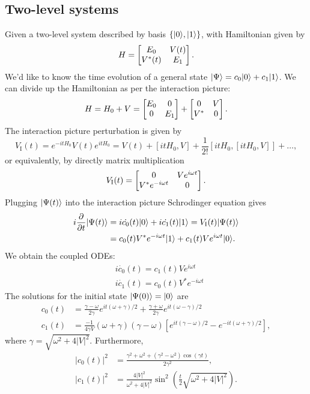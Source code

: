 \documentclass{article}
\begin{document}
\subsection{Two-level systems}
Given a two-level system described by basis $\{|0\rangle,|1\rangle\}$, with Hamiltonian given by
\begin{equation}
    H=\begin{bmatrix}{E_0}&{V(t)}\\{V^*(t)}&{E_1}\end{bmatrix}.
\end{equation}
We'd like to know the time evolution of a general state $|\Psi\rangle=c_0|0\rangle+c_1|1\rangle$. We can divide up the Hamiltonian as per the interaction picture:
\begin{equation}
    H=H_0+V=\begin{bmatrix}{E_0}&{0}\\{0}&{E_1}\end{bmatrix}+\begin{bmatrix}{0}&{V}\\{V^*}&{0}\end{bmatrix}.
\end{equation}
The interaction picture perturbation is given by
\begin{equation}
    V_{\mathrm{I}}(t)=e^{-itH_0}V(t)e^{itH_0}=V(t)+[itH_0,V]+\frac{1}{2!}[itH_0,[itH_0,V]]+\dots,
\end{equation}
or equivalently, by directly matrix multiplication
\begin{equation}
    V_{\mathrm{I}}(t)=\begin{bmatrix}{0}&{Ve^{i\omega t}}\\{V^*e^{-i\omega t}}&{0}\end{bmatrix}.
\end{equation}
Plugging $|\Psi(t)\rangle$ into the interaction picture Schrodinger equation gives
\begin{align}
    i\diffp{}{t}|\Psi(t)\ket &= i\dot{c_0}(t)|0\ket+i\dot{c_1}(t)|1\ket=V_{\mathrm{I}}(t)|\Psi(t)\ket\\
    &=c_0(t)V^*e^{-i\omega t}|1\ket + c_1(t)Ve^{i\omega t}|0\ket.
\end{align}
We obtain the coupled ODEs:
\begin{align}
    &i\dot{c_0}(t)=c_1(t)Ve^{i\omega t}\\
    &i\dot{c_1}(t)=c_0(t)V^*e^{-i\omega t}
\end{align}
The solutions for the initial state $|\Psi(0)\rangle=|0\rangle$ are
\begin{align}
    c_0(t)&=\frac{\gamma-\omega}{2\gamma}e^{it(\omega+\gamma)/2}+\frac{\gamma+\omega}{2\gamma}e^{it(\omega-\gamma)/2}\\
    c_1(t)&=\frac{-1}{4\gamma V}(\omega+\gamma)(\gamma-\omega)\left[e^{it(\gamma-\omega)/2} - e^{-it(\omega+\gamma)/2}  \right],
\end{align}
where $\gamma=\sqrt{\omega^2+4|V|^2}$. Furthermore,
\begin{align}
    |c_0(t)|^2&=\frac{\gamma^2+\omega^2+(\gamma^2-\omega^2)\cos(\gamma t)}{2\gamma^2},\\
    |c_1(t)|^2&=\frac{4|V|^2}{\omega^2+4|V|^2}\sin^2\left( \frac{t}{2}\sqrt{ \omega^2+4|V|^2 } \right).
\end{align}
\end{document}

